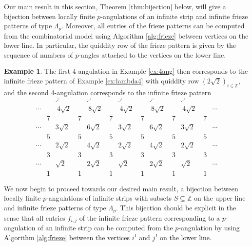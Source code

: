 \documentclass[11pt,a4paper]{amsart}
\theoremstyle{definition}
\newtheorem{Example}[Lemma]{Example}
\numberwithin{equation}{section}
\begin{document}
\medskip

Our main result in this section, Theorem \ref{thm:bijection} below, 
will give a bijection between locally finite $p$-angulations of an infinite strip
and infinite frieze patterns of type $\Lambda_p$. Moreover, all entries of the frieze patterns can be computed 
from the combinatorial model using Algorithm \ref{alg:frieze} between vertices on the lower line. 
In particular, the quiddity row of the frieze pattern is given by the sequence of numbers of $p$-angles attached
to the vertices on the lower line. 
\smallskip

\begin{Example}
The first 4-angulation in Example \ref{ex:4ang} then corresponds to the infinite frieze pattern
of Example \ref{ex:lambda4} with quiddity row $(2\sqrt{2})_{i\in \mathbb{Z}}$,
and the second 4-angulation corresponds to the infinite frieze pattern
  $$\begin{array}{ccccccccccccc}
& & \iddots & & \iddots & & \iddots & & \iddots & & \iddots & & \\
\cdots & & ~4\sqrt{2}~ & & ~8\sqrt{2}~ & & ~4\sqrt{2}~ & & ~8\sqrt{2}~ & & ~4\sqrt{2}~ & & \cdots \\
& 7& & 7& & 7 & & 7 & & 7 & &7 & \\
\cdots & & 3\sqrt{2} & & 6\sqrt{2} & & 3\sqrt{2}& & 6\sqrt{2} & & 3\sqrt{2} & & \cdots \\
& 5& & 5& & 5 & & 5 & & 5 & &5 & \\
\cdots & & 2\sqrt{2} & & 4\sqrt{2} & & 2\sqrt{2}& & 4\sqrt{2} & & 2\sqrt{2} & & \cdots \\
& 3& & 3& & 3 & & 3 & & 3 & &3 & \\
\cdots & & \sqrt{2} & & 2\sqrt{2} & & \sqrt{2} & & 2\sqrt{2} & & \sqrt{2} &  & \cdots \\
  & 1 & & 1 & & 1 & & 1 & & 1 & & 1 & 
 \end{array}
$$
\end{Example}
\medskip

We now begin to proceed towards our desired main result, a bijection between locally finite 
$p$-angulations of infinite strips
with subsets $S\subseteq \mathbb{Z}$ on the upper line and infinite frieze patterns of type $\Lambda_p$. This 
bijection should be explicit in the sense that all entries $f_{i,j}$ of the infinite frieze pattern 
corresponding to a $p$-angulation of an infinite strip can be computed from the $p$-angulation
by using Algorithm \ref{alg:frieze}
between the vertices $i^I$ and $j^I$ on the lower line. 
\medskip
\end{document}
